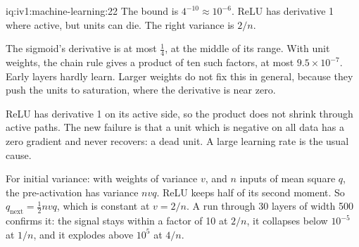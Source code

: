 \begin{solution}{iq:iv1:machine-learning:22}
The bound is $4^{-10} \approx 10^{-6}$. ReLU has derivative 1 where active, but units can die. The right variance is $2/n$.

The sigmoid's derivative is at most $\frac14$, at the middle of its range. With unit weights, the chain rule gives a product of ten such factors, at most $9.5 \times 10^{-7}$. Early layers hardly learn. Larger weights do not fix this in general, because they push the units to saturation, where the derivative is near zero.

ReLU has derivative 1 on its active side, so the product does not shrink through active paths. The new failure is that a unit which is negative on all data has a zero gradient and never recovers: a dead unit. A large learning rate is the usual cause.

For initial variance: with weights of variance $v$, and $n$ inputs of mean square $q$, the pre-activation has variance $nvq$. ReLU keeps half of its second moment. So $q_{\text{next}} = \frac12 nvq$, which is constant at $v = 2/n$. A run through 30 layers of width 500 confirms it: the signal stays within a factor of 10 at $2/n$, it collapses below $10^{-5}$ at $1/n$, and it explodes above $10^5$ at $4/n$.



\end{solution}

